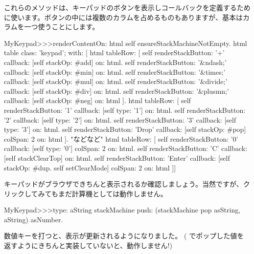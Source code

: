 \documentclass[a4paper,10pt,twoside]{book}
\begin{document}
これらのメソッドは、キーパッドのボタンを表示しコールバックを定義するために使います。ボタンの中には複数のカラムを占めるものもありますが、基本はカラムを一つ使うことにします。


\begin{code}{}
MyKeypad>>>renderContentOn: html 
  self ensureStackMachineNotEmpty.
  html table
    class: 'keypad';
    with: [
      html tableRow: [
          self renderStackButton: '+' callback: [self stackOp: #add] on: html.
          self renderStackButton: '&ndash;' callback: [self stackOp: #min] on: html.
          self renderStackButton: '&times;' callback: [self stackOp: #mul] on: html.
          self renderStackButton: '&divide;' callback: [self stackOp: #div] on: html.
          self renderStackButton: '&plusmn;' callback: [self stackOp: #neg] on: html ].
        html tableRow: [
          self renderStackButton: '1' callback: [self type: '1'] on: html.
          self renderStackButton: '2' callback: [self type: '2'] on: html.
          self renderStackButton: '3' callback: [self type: '3'] on: html.
          self renderStackButton: 'Drop' callback: [self stackOp: #pop]
          	colSpan: 2 on: html ].
"などなど"
        html tableRow: [
          self renderStackButton: '0' callback: [self type: '0'] colSpan: 2 on: html.
          self renderStackButton: 'C' callback: [self stackClearTop] on: html.
          self renderStackButton: 'Enter'
          	callback: [self stackOp: #dup. self setClearMode]
			colSpan: 2 on: html ]]
\end{code}

キーパッドがブラウザできちんと表示されるか確認しましょう。当然ですが、クリックしてみてもまだ計算機としては動作しません。


\begin{code}{}
MyKeypad>>>type: aString
	stackMachine push: (stackMachine pop asString, aString) asNumber.
\end{code}
数値キーを打つと、表示が更新されるようになりました。
( でポップした値を返すようにきちんと実装していないと、動作しません!)
\end{document}
